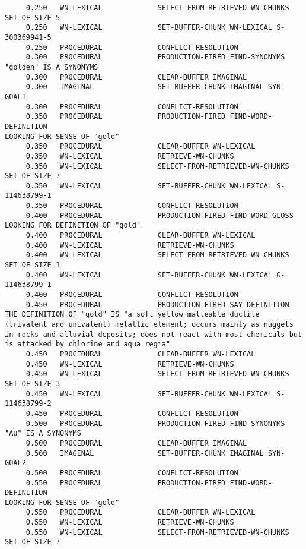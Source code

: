 \begin{verbatim}
     0.250   WN-LEXICAL             SELECT-FROM-RETRIEVED-WN-CHUNKS SET OF SIZE 5 
     0.250   WN-LEXICAL             SET-BUFFER-CHUNK WN-LEXICAL S-300369941-5 
     0.250   PROCEDURAL             CONFLICT-RESOLUTION 
     0.300   PROCEDURAL             PRODUCTION-FIRED FIND-SYNONYMS 
"golden" IS A SYNONYMS 
     0.300   PROCEDURAL             CLEAR-BUFFER IMAGINAL 
     0.300   IMAGINAL               SET-BUFFER-CHUNK IMAGINAL SYN-GOAL1 
     0.300   PROCEDURAL             CONFLICT-RESOLUTION 
     0.350   PROCEDURAL             PRODUCTION-FIRED FIND-WORD-DEFINITION 
LOOKING FOR SENSE OF "gold" 
     0.350   PROCEDURAL             CLEAR-BUFFER WN-LEXICAL 
     0.350   WN-LEXICAL             RETRIEVE-WN-CHUNKS 
     0.350   WN-LEXICAL             SELECT-FROM-RETRIEVED-WN-CHUNKS SET OF SIZE 7 
     0.350   WN-LEXICAL             SET-BUFFER-CHUNK WN-LEXICAL S-114638799-1 
     0.350   PROCEDURAL             CONFLICT-RESOLUTION 
     0.400   PROCEDURAL             PRODUCTION-FIRED FIND-WORD-GLOSS 
LOOKING FOR DEFINITION OF "gold" 
     0.400   PROCEDURAL             CLEAR-BUFFER WN-LEXICAL 
     0.400   WN-LEXICAL             RETRIEVE-WN-CHUNKS 
     0.400   WN-LEXICAL             SELECT-FROM-RETRIEVED-WN-CHUNKS SET OF SIZE 1 
     0.400   WN-LEXICAL             SET-BUFFER-CHUNK WN-LEXICAL G-114638799-1 
     0.400   PROCEDURAL             CONFLICT-RESOLUTION 
     0.450   PROCEDURAL             PRODUCTION-FIRED SAY-DEFINITION 
THE DEFINITION OF "gold" IS "a soft yellow malleable ductile (trivalent and univalent) metallic element; occurs mainly as nuggets in rocks and alluvial deposits; does not react with most chemicals but is attacked by chlorine and aqua regia" 
     0.450   PROCEDURAL             CLEAR-BUFFER WN-LEXICAL 
     0.450   WN-LEXICAL             RETRIEVE-WN-CHUNKS 
     0.450   WN-LEXICAL             SELECT-FROM-RETRIEVED-WN-CHUNKS SET OF SIZE 3 
     0.450   WN-LEXICAL             SET-BUFFER-CHUNK WN-LEXICAL S-114638799-2 
     0.450   PROCEDURAL             CONFLICT-RESOLUTION 
     0.500   PROCEDURAL             PRODUCTION-FIRED FIND-SYNONYMS 
"Au" IS A SYNONYMS 
     0.500   PROCEDURAL             CLEAR-BUFFER IMAGINAL 
     0.500   IMAGINAL               SET-BUFFER-CHUNK IMAGINAL SYN-GOAL2 
     0.500   PROCEDURAL             CONFLICT-RESOLUTION 
     0.550   PROCEDURAL             PRODUCTION-FIRED FIND-WORD-DEFINITION 
LOOKING FOR SENSE OF "gold" 
     0.550   PROCEDURAL             CLEAR-BUFFER WN-LEXICAL 
     0.550   WN-LEXICAL             RETRIEVE-WN-CHUNKS 
     0.550   WN-LEXICAL             SELECT-FROM-RETRIEVED-WN-CHUNKS SET OF SIZE 7 

\end{verbatim}
